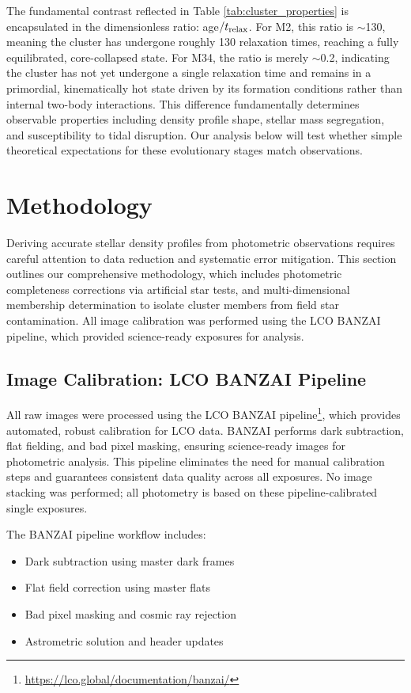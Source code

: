 \documentclass[linenumbers,trackchanges,twocolumn]{aastex701}
\begin{document}
The fundamental contrast reflected in Table \ref{tab:cluster_properties} is encapsulated in the dimensionless ratio: age$/t_{\rm relax}$. For M2, this ratio is $\sim$130, meaning the cluster has undergone roughly 130 relaxation times, reaching a fully equilibrated, core-collapsed state. For M34, the ratio is merely $\sim$0.2, indicating the cluster has not yet undergone a single relaxation time and remains in a primordial, kinematically hot state driven by its formation conditions rather than internal two-body interactions. This difference fundamentally determines observable properties including density profile shape, stellar mass segregation, and susceptibility to tidal disruption. Our analysis below will test whether simple theoretical expectations for these evolutionary stages match observations.

\section{Methodology} \label{sec:methodology}


Deriving accurate stellar density profiles from photometric observations requires careful attention to data reduction and systematic error mitigation. This section outlines our comprehensive methodology, which includes photometric completeness corrections via artificial star tests, and multi-dimensional membership determination to isolate cluster members from field star contamination. All image calibration was performed using the LCO BANZAI pipeline, which provided science-ready exposures for analysis.


\subsection{Image Calibration: LCO BANZAI Pipeline}

All raw images were processed using the LCO BANZAI pipeline\footnote{\url{https://lco.global/documentation/banzai/}}, which provides automated, robust calibration for LCO data. BANZAI performs dark subtraction, flat fielding, and bad pixel masking, ensuring science-ready images for photometric analysis. This pipeline eliminates the need for manual calibration steps and guarantees consistent data quality across all exposures. No image stacking was performed; all photometry is based on these pipeline-calibrated single exposures.

The BANZAI pipeline workflow includes:
\begin{itemize}
    \item Dark subtraction using master dark frames
    \item Flat field correction using master flats
    \item Bad pixel masking and cosmic ray rejection
    \item Astrometric solution and header updates
\end{itemize}
\end{document}
